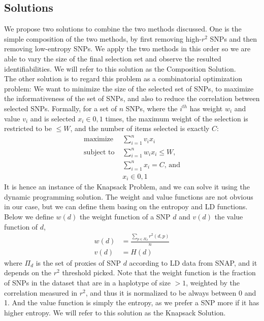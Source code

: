 \documentclass[14pt, oneside]{article}   	%
\begin{document}
\subsection{Solutions}\label{sec:soln}
We propose two solutions to combine the two methods discussed.
One is the simple composition of the two methods, by first removing high-$r^2$ SNPs and then removing low-entropy SNPs.
We apply the two methods in this order so we are able to vary the size of the final selection set and observe the resulted identifiabilities.
We will refer to this solution as the Composition Solution.
\\
The other solution is to regard this problem as a combinatorial optimization problem:
We want to minimize the size of the selected set of SNPs, to maximize the informativeness of the set of SNPs,
and also to reduce the correlation between selected SNPs.
Formally, for a set of $n$ SNPs, where the $i^{th}$ has weight $w_i$ and value $v_i$ and is selected $x_i \in {0, 1}$ times,
the maximum weight of the selection is restricted to be $\leq W$,
and the number of items selected is exactly $C$:
\begin{align*}
\text{maximize}  &\sum\limits_{i=1}^{n}{v_i x_i}\\
\text{subject to } &\sum\limits_{i=1}^{n}{w_i x_i} \leq W \text{,}\\
                           &\sum\limits_{i=1}^{n}{x_i} = C \text{, and}\\
                           &x_i \in {0, 1}
\end{align*}
It is hence an instance of the Knapsack Problem, and we can solve it using the dynamic programming solution.
The weight and value functions are not obvious in our case, but we can define them basing on the entropoy and LD functions.
Below we define $w(d)$ the weight function of a SNP $d$ and $v(d)$ the value function of $d$,
\begin{align*}
w(d) &= \frac{\sum\limits_{p \in \Pi_d} r^2(d, p)}{n}\\
v(d) &= H(d)
\end{align*}
where $\Pi_d$ is the set of proxies of SNP $d$ according to LD data from SNAP, and it depends on the $r^2$ threshold picked.
Note that the weight function is the fraction of SNPs in the dataset that are in a haplotype of size $> 1$,
weighted by the correlation measured in $r^2$, and thus it is normalized to be always between 0 and 1.
And the value function is simply the entropy, as we prefer a SNP more if it has higher entropy.
We will refer to this solution as the Knapsack Solution.
%
%
%
%
\end{document}
